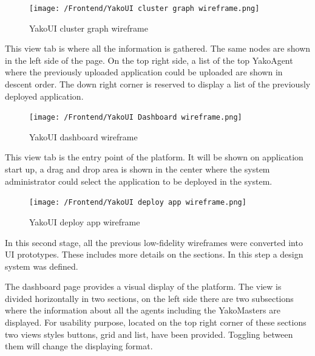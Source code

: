                 \begin{figure}[H]
                    \centering
                    \texttt{[image: /Frontend/YakoUI cluster graph wireframe.png]}
                    \caption{YakoUI cluster graph wireframe}
                    \label{fig:cluster_wireframe}
                \end{figure}
                
                This view tab is where all the information is gathered. The same nodes are shown in the left side of the page. On the top right side, a list of the top YakoAgent where the previously uploaded application could be uploaded are shown in descent order.
                The down right corner is reserved to display a list of the previously deployed application.
                
                \begin{figure}[H]
                    \centering
                    \texttt{[image: /Frontend/YakoUI Dashboard wireframe.png]}
                    \caption{YakoUI dashboard wireframe}
                    \label{fig:dashboard_wireframe}
                \end{figure}
                
                This view tab is the entry point of the platform. It will be shown on application start up, a drag and drop area is shown in the center where the system administrator could select the application to be deployed in the system.
                
                \begin{figure}[H]
                    \centering
                    \texttt{[image: /Frontend/YakoUI deploy app wireframe.png]}
                    \caption{YakoUI deploy app wireframe}
                    \label{fig:deploy_wireframe}
                \end{figure}
        
            In this second stage, all the previous low-fidelity wireframes were converted into UI prototypes. These includes more details on the sections. In this step a design system was defined.
            
                The dashboard page provides a visual display of the platform. The view is divided horizontally in two sections, on the left side there are two subsections where the information about all the agents including the YakoMasters are displayed. For usability purpose, located on the top right corner of these sections two views styles buttons, grid and list, have been provided. Toggling between them will change the displaying format.
                
